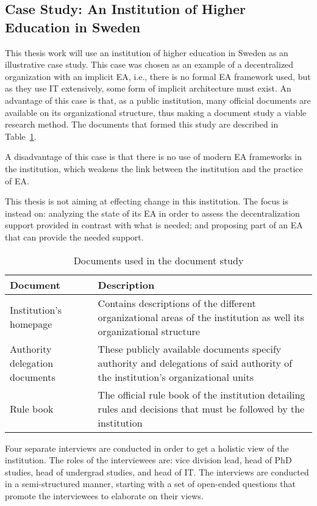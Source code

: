 \subsection{Case Study: An Institution of Higher Education in Sweden}
\label{sec:case}

This thesis work will use an institution of higher education in Sweden as an illustrative case study. This case was chosen as an example of a decentralized organization with an implicit EA, i.e., there is no formal EA framework used, but as they use IT extensively, some form of implicit architecture must exist. An advantage of this case is that, as a public institution, many official documents are available on its organizational structure, thus making a document study a viable research method. The documents that formed this study are described in Table~\ref{tab:doc_study}.

A disadvantage of this case is that there is no use of modern EA frameworks in the institution, which weakens the link between the institution and the practice of EA. 

This thesis is not aiming at effecting change in this institution. The focus is instead on: analyzing the state of its EA in order to assess the decentralization support provided in contrast with what is needed; and proposing part of an EA that can provide the needed support. 

\begin{table}  
  \begin{tabular}[c]{| p{} |
                       p{} | }
    \hline
    \textbf{Document} & \textbf{Description} \\
    \hline
    Institution's homepage & Contains descriptions of the different organizational areas of the institution as well its organizational structure \\
    \hline
    Authority delegation documents & These publicly available documents specify authority and delegations of said authority of the institution's organizational units \\
    \hline
    Rule book & The official rule book of the institution detailing rules and decisions that must be followed by the institution \\
    \hline
  \end{tabular}
  \caption{Documents used in the document study}
  \label{tab:doc_study}
\end{table}

Four separate interviews are conducted in order to get a holistic view of the institution. The roles of the interviewees are: vice division lead, head of PhD studies, head of undergrad studies, and head of IT. The interviews are conducted in a semi-structured manner, starting with a set of open-ended questions that promote the interviewees to elaborate on their views. 

